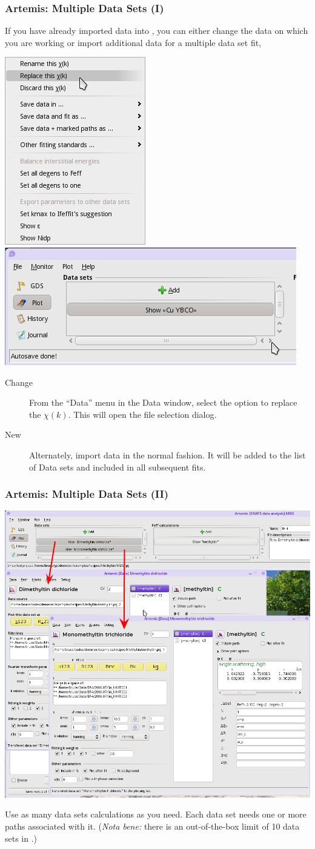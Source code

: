 \documentclass[10pt, xcolor=x11names, compress]{beamer}
\begin{document}
\begin{frame}
  \frametitle{Artemis: Multiple Data Sets (I)}

  If you have already imported data into {\artemis}, you can either
  change the data on which you are working or import additional data
  for a multiple data set fit,

  \begin{center}
    \includegraphics[width=0.2\linewidth]{artemis/change_data.png}\qquad
    \includegraphics[width=0.4\linewidth]{artemis/data_import.png}
  \end{center}

  \begin{description}
  \item[Change] From the ``Data'' menu in the Data window, select the
    option to replace the $\chi(k)$.  This will open the file
    selection dialog.
  \item[New] Alternately, import data in the normal fashion.  It will
    be added to the list of Data sets and included in all subsequent
    fits.
  \end{description}
\end{frame}

\begin{frame}
  \frametitle{Artemis: Multiple Data Sets (II)}

  \begin{center}
    \includegraphics[width=0.6\linewidth]{artemis/mds.png}

    Use as many data sets calculations as you need.  Each data set
    needs one or more paths associated with it.  (\textit{Nota bene:}
    there is an out-of-the-box limit of 10 data sets in {\ifeffit}.)
  \end{center}
\end{frame}
\end{document}
